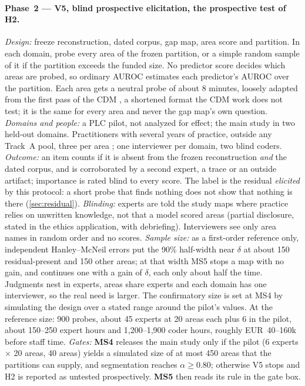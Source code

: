 \paragraph{Phase~2 --- V5, blind prospective elicitation, the prospective test of H2.} \evfut{}
\emph{Design:} freeze reconstruction, dated corpus, gap map, area score and partition. In each domain,
probe every area of the frozen partition, or a simple random sample of it if the partition exceeds the
funded size. No predictor score decides which areas are probed, so ordinary AUROC estimates each
predictor's AUROC over the partition. Each area gets a neutral probe of about 8 minutes, loosely adapted from the first pass of the CDM \parencite{klein1989critical}, a shortened format the CDM work does not test; it is the same for every area and never the gap map's own question. \emph{Domains
and people:} a PLC pilot, not analyzed for effect; the main study in two held-out domains. Practitioners
with several years of practice, outside any Track~A pool, three per area \parencite{chao1994percentage};
one interviewer per domain, two blind coders. \emph{Outcome:} an item counts if it is absent from the
frozen reconstruction \emph{and} the dated corpus, and is corroborated by a second expert, a trace or an
outside artifact; importance is rated blind to every score. The label is the residual \emph{elicited} by
this protocol: a short probe that finds nothing does not show that nothing is there (\cref{sec:residual}).
\emph{Blinding:} experts are told the study maps where practice relies on unwritten knowledge, not that
a model scored areas (partial disclosure, stated in the ethics application, with debriefing).
Interviewers see only area names in random order and no scores. \emph{Sample size:} as a first-order
reference only, independent Hanley--McNeil errors put the 90\% half-width near $\delta$ at about 150
residual-present and 150 other areas; at that width MS5 stops a map with no gain, and continues one with
a gain of $\delta$, each only about half the time. Judgments nest in experts, areas share experts and
each domain has one interviewer, so the real need is larger. The confirmatory size is set at MS4 by
simulating the design over a stated range around the pilot's values. At the reference size: 900 probes,
about 45 experts at 20 areas each plus 6 in the pilot, about 150--250 expert hours and 1,200--1,900
coder hours, roughly EUR~40--160k before staff time. \emph{Gates:} \textbf{MS4} releases the main study
only if the pilot (6 experts $\times$ 20 areas, 40 areas) yields a simulated size of at most 450 areas
that the partitions can supply, and segmentation reaches $\alpha \geq 0.80$; otherwise V5 stops and H2
is reported as untested prospectively. \textbf{MS5} then reads its rule in the gate box.

